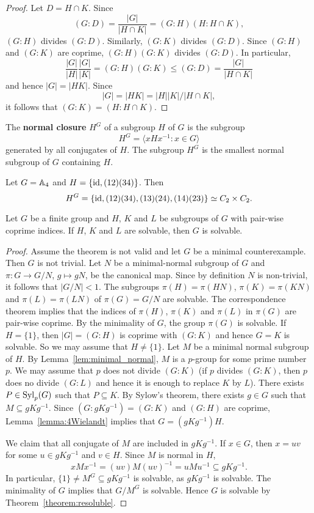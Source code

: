\begin{proof}
	Let $D=H\cap K$. Since
	\[
	(G:D)=\frac{|G|}{|H\cap K|}=(G:H)(H:H\cap K),
	\]
	$(G:H)$ divides $(G:D)$. Similarly, $(G:K)$ divides 
	$(G:D)$. Since $(G:H)$ and $(G:K)$ are coprime, $(G:H)(G:K)$
	divides $(G:D)$. In particular, 
	\[
	\frac{|G|}{|H|}\frac{|G|}{|K|}=(G:H)(G:K)\leq (G:D)=\frac{|G|}{|H\cap K|}
	\]
	and hence $|G|=|HK|$. Since 
	\[
	|G|=|HK|=|H||K|/|H\cap K|, 
	\]
	it follows that 
	$(G:K)=(H:H\cap K)$.
\end{proof}

The 
\textbf{normal closure} $H^G$ of a subgroup $H$ of $G$ is the subgroup
\[
	H^G=\langle xHx^{-1}:x\in G\rangle
\]
generated by all conjugates of $H$. The 
subgroup $H^G$ is the smallest normal subgroup of $G$ containing $H$. 

\begin{example}
	Let $G=\mathbb{A}_4$ and $H=\{\operatorname{id},(12)(34)\}$. Then 
	\[
	H^G=\{\operatorname{id},(12)(34),(13)(24),(14)(23)\}\simeq C_2\times C_2.
	\]
\end{example}


\begin{theorem}[Wielandt]
	\label{theorem:Wielandt:solvable}
	Let $G$ be a finite group and $H$, $K$ and $L$ be subgroups of $G$ 
	with pair-wise coprime indices. If $H$, $K$ and $L$ are solvable, 
	then $G$ is solvable. 
\end{theorem}

\begin{proof}
	Assume the theorem is not valid and let $G$ be a minimal counterexample. 
	Then $G$ is not trivial.  
	Let $N$ be a minimal-normal subgroup of 
	$G$ and $\pi\colon G\to G/N$, $g\mapsto gN$, be the canonical map. Since 
	by definition $N$ is non-trivial, 
	it follows that $|G/N|<1$. 
	The subgroups 
	$\pi(H)=\pi(HN)$, $\pi(K)=\pi(KN)$ and $\pi(L)=\pi(LN)$ of $\pi(G)=G/N$ are solvable. 
	The correspondence theorem implies that 
	the indices of $\pi(H)$, $\pi(K)$ and $\pi(L)$ in $\pi(G)$ are pair-wise coprime. By the 
	minimality of $G$, the group 
	$\pi(G)$ is solvable. If $H=\{1\}$, then 
	$|G|=(G:H)$ is coprime with $(G:K)$ and hence $G=K$ is solvable. So we may assume that  
	$H\ne \{1\}$. Let $M$ be a minimal normal subgroup of $H$. By
	Lemma~\ref{lem:minimal_normal}, $M$ is a $p$-group for some prime number $p$. We may
	assume that $p$ does not divide 
	$(G:K)$ (if $p$ divides $(G:K)$, then $p$ does no divide $(G:L)$ and 
	hence it is enough to replace $K$ by $L$). There exists 
	$P\in\mathrm{Syl}_p(G)$ such that $P\subseteq K$. By Sylow's theorem, 
	there exists  $g\in G$ such that $M\subseteq
	gKg^{-1}$. Since $(G:gKg^{-1})=(G:K)$ and $(G:H)$ are coprime, 
	Lemma~\ref{lemma:4Wielandt} implies that $G=(gKg^{-1})H$. 
	
	We claim that all conjugate of $M$ are included in $gKg^{-1}$. 
	If $x\in G$, then $x=uv$ for some $u\in 
	gKg^{-1}$ and $v\in H$. Since $M$ is normal in $H$, 
	\[
	xMx^{-1}=(uv)M(uv)^{-1}=uMu^{-1}\subseteq gKg^{-1}.
	\]
	In particular, $\{1\}\ne M^G\subseteq gKg^{-1}$ is solvable, as $gKg^{-1}$ is
	solvable. The minimality of $G$ implies that $G/M^G$ is solvable. Hence 
	$G$ is solvable by Theorem~\ref{theorem:resoluble}.
\end{proof}


